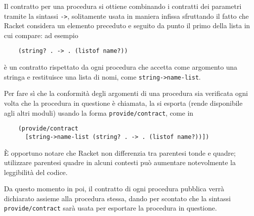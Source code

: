 Il contratto per una procedura si ottiene combinando i contratti dei
parametri tramite la sintassi \lstinline{->}, solitamente usata in maniera
infissa sfruttando il fatto che Racket considera un elemento preceduto e
seguito da punto il primo della lista in cui compare: ad esempio

\begin{lstlisting}
    (string? . -> . (listof name?))
\end{lstlisting}

\`e un contratto rispettato da ogni procedura che accetta come argomento una
stringa e restituisce una lista di nomi, come \lstinline{string->name-list}.

Per fare s\`i che la conformit\`a degli argomenti di una procedura sia
verificata ogni volta che la procedura in questione \`e chiamata, la si
esporta (rende disponibile agli altri moduli) usando la forma
\lstinline{provide/contract}, come in

\begin{lstlisting}
    (provide/contract
      [string->name-list (string? . -> . (listof name?))])
\end{lstlisting}

\`E opportuno notare che Racket non differenzia tra parentesi tonde e quadre;
utilizzare parentesi quadre in alcuni contesti pu\`o aumentare notevolmente
la leggibilit\`a del codice.

Da questo momento in poi, il contratto di ogni procedura pubblica verr\`a
dichiarato assieme alla procedura stessa, dando per scontato che la
sintassi \lstinline{provide/contract} sar\`a usata per esportare la
procedura in questione.

